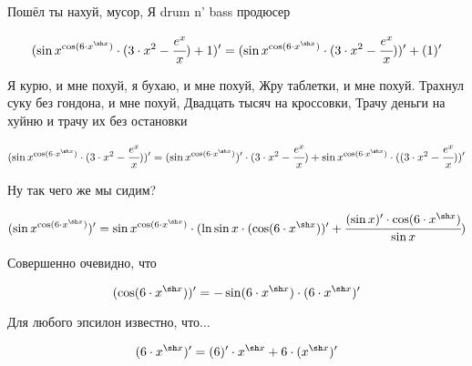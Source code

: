      
\usepackage{upgreek} 

     



Пошёл ты нахуй, мусор, Я drum n' bass продюсер


\begin{dmath}
({{{ \sin  x } ^ { \cos ({ 6 } \cdot {{ x } ^ { \sh  x }})}} \cdot {({{ 3 } \cdot {{ x } ^ { 2 }}} - { \cfrac {{ e } ^ { x }}{ x }})}} + { 1 })' = ({{ \sin  x } ^ { \cos ({ 6 } \cdot {{ x } ^ { \sh  x }})}} \cdot {({{ 3 } \cdot {{ x } ^ { 2 }}} - { \cfrac {{ e } ^ { x }}{ x }})})' + ( 1 )'
\end{dmath}


Я курю, и мне похуй, я бухаю, и мне похуй, Жру таблетки, и мне похуй. Трахнул суку без гондона, и мне похуй, Двадцать тысяч на кроссовки, Трачу деньги на хуйню и трачу их без остановки


\begin{dmath}
({{ \sin  x } ^ { \cos ({ 6 } \cdot {{ x } ^ { \sh  x }})}} \cdot {({{ 3 } \cdot {{ x } ^ { 2 }}} - { \cfrac {{ e } ^ { x }}{ x }})})' = ({ \sin  x } ^ { \cos ({ 6 } \cdot {{ x } ^ { \sh  x }})})' \cdot ({{ 3 } \cdot {{ x } ^ { 2 }}} - { \cfrac {{ e } ^ { x }}{ x }}) + { \sin  x } ^ { \cos ({ 6 } \cdot {{ x } ^ { \sh  x }})} \cdot (({{ 3 } \cdot {{ x } ^ { 2 }}} - { \cfrac {{ e } ^ { x }}{ x }}))'
\end{dmath}


Ну так чего же мы сидим?


\begin{dmath}
({ \sin  x } ^ { \cos ({ 6 } \cdot {{ x } ^ { \sh  x }})})' = { \sin  x } ^ { \cos ({ 6 } \cdot {{ x } ^ { \sh  x }})} \cdot ( \ln  \sin  x  \cdot ( \cos ({ 6 } \cdot {{ x } ^ { \sh  x }}))' +  \cfrac {( \sin  x )' \cdot  \cos ({ 6 } \cdot {{ x } ^ { \sh  x }})}{ \sin  x })
\end{dmath}


Совершенно очевидно, что


\begin{dmath}
( \cos ({ 6 } \cdot {{ x } ^ { \sh  x }}))' =  -  \sin ({ 6 } \cdot {{ x } ^ { \sh  x }}) \cdot ({ 6 } \cdot {{ x } ^ { \sh  x }})'
\end{dmath}


Для любого эпсилон известно, что...


\begin{dmath}
({ 6 } \cdot {{ x } ^ { \sh  x }})' = ( 6 )' \cdot { x } ^ { \sh  x } +  6  \cdot ({ x } ^ { \sh  x })'
\end{dmath}


